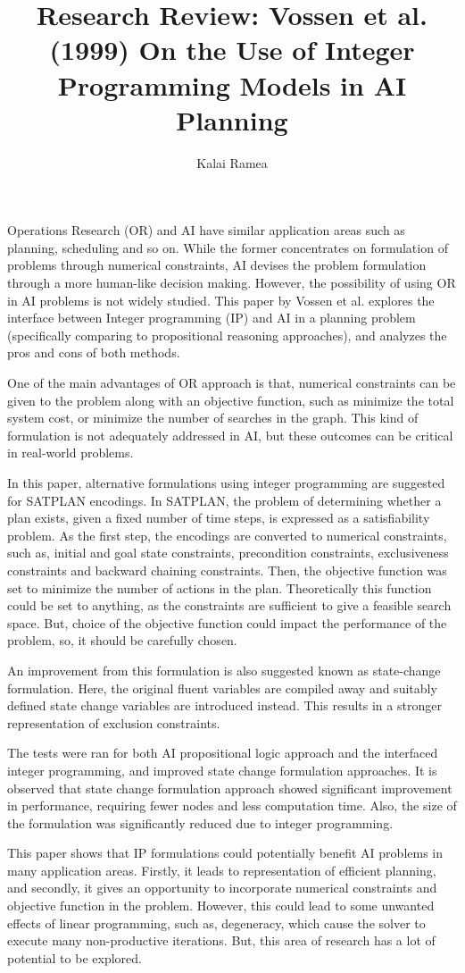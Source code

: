 \documentclass[12pt]{article}
\title{Research Review: Vossen et al. (1999) On the Use of Integer Programming Models in AI Planning}
\author{Kalai Ramea}
\begin{document}
\maketitle

Operations Research (OR) and AI have similar application areas such as planning, scheduling and so on. While the former concentrates on formulation of problems through numerical constraints, AI devises the problem formulation through a more human-like decision making. However, the possibility of using OR in AI problems is not widely studied. This paper by Vossen et al. explores the interface between Integer programming (IP) and AI in a planning problem (specifically comparing to propositional reasoning approaches), and analyzes the pros and cons of both methods. 

One of the main advantages of OR approach is that, numerical constraints can be given to the problem along with an objective function, such as minimize the total system cost, or minimize the number of searches in the graph. This kind of formulation is not adequately addressed in AI, but these outcomes can be critical in real-world problems. 

In this paper, alternative formulations using integer programming are suggested for SATPLAN encodings. In SATPLAN, the problem of determining whether a plan exists, given a fixed number of time steps, is expressed as a satisfiability problem. As the first step, the encodings are converted to numerical constraints, such as, initial and goal state constraints, precondition constraints, exclusiveness constraints and backward chaining constraints. Then, the objective function was set to minimize the number of actions in the plan. Theoretically this function could be set to anything, as the constraints are sufficient to give a feasible search space. But, choice of the objective function could impact the performance of the problem, so, it should be carefully chosen. 

An improvement from this formulation is also suggested known as state-change formulation. Here, the original fluent variables are compiled away and suitably defined state change variables are introduced instead. This results in a stronger representation of exclusion constraints. 

The tests were ran for both AI propositional logic approach and the interfaced integer programming, and improved state change formulation approaches. It is observed that state change formulation approach showed significant improvement in performance, requiring fewer nodes and less computation time. Also, the size of the formulation was significantly reduced due to integer programming.

This paper shows that IP formulations could potentially benefit AI problems in many application areas. Firstly, it leads to representation of efficient planning, and secondly, it gives an opportunity to incorporate numerical constraints and objective function in the problem. However, this could lead to some unwanted effects of linear programming, such as, degeneracy, which cause the solver to execute many non-productive iterations. But, this area of research has a lot of potential to be explored.
\end{document}
